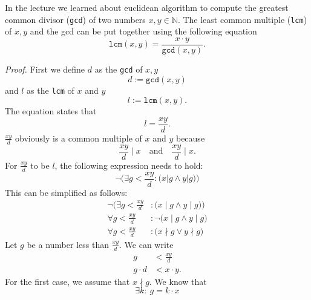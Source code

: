 \documentclass[12pt]{article}
\begin{document}
 

 

  In the lecture we learned about euclidean algorithm to compute the greatest common divisor (\texttt{gcd}) of two numbers $x,y\in \mathbb{N}$. The least common multiple (\texttt{lcm}) of $x,y$ and the gcd can be put together using the following equation \begin{equation}
 	\texttt{lcm}(x,y)=\frac{x\cdot y}{\texttt{gcd}(x,y)}.
 \end{equation}
 
 \textit{Proof.} First we define $d$ as the \texttt{gcd} of $x,y$ \begin{equation}
 	d:=\texttt{gcd}(x,y)
 \end{equation} and $l$ as the \texttt{lcm} of $x$ and $y$ \begin{equation}
 	l:=\texttt{lcm}(x,y).
 \end{equation}
 The equation states that \begin{equation}
 	l=\frac{xy}{d}.
 \end{equation}
 $\frac{xy}{d}$ obviously is a common multiple of $x$ and $y$ because \begin{equation}
 	\frac{xy}{d}\mid x\quad\textrm{and}\quad\frac{xy}{d}\mid x.
 \end{equation}
 For $\frac{xy}{d}$ to be $l$, the following expression needs to hold: \begin{equation}
 	\lnot\bigg(\exists g<\frac{xy}{d}:\big(x|g\land y|g\big)\bigg)
 \end{equation} This can be simplified as follows: \begin{align}
 	\lnot\bigg(\exists g<\frac{xy}{d}&:\big(x\mid g\land y\mid g\big)\bigg) \\
 	\forall g<\frac{xy}{d}&:\lnot\big(x\mid g\land y\mid g\big) \\
 	\forall g<\frac{xy}{d}&:\big(x\nmid g\lor y\nmid g\big)
 \end{align}
 Let $g$ be a number less than $\frac{xy}{d}$. We can write \begin{align}
 	g&<\frac{xy}{d} \\
 	g\cdot d&<x\cdot y.
 \end{align}
 For the first case, we assume that $x\nmid g$. We know that \begin{equation}
 	\exists k:\ g=k \cdot x
 \end{equation}
 
\end{document}
